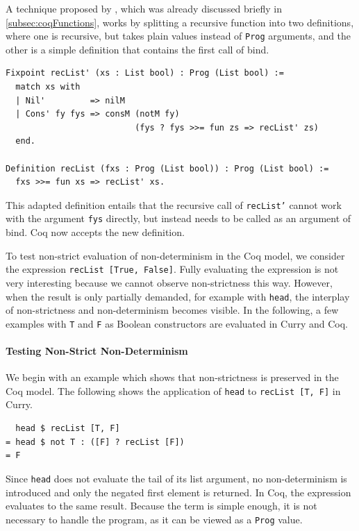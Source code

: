 \documentclass[a4paper, 11pt, fleqn, twoside, abstract=on]{scrreprt}
\newcommand{\hinl}[1]{\texttt{#1}}
\newcommand{\cinl}[1]{\texttt{#1}}
\begin{document}
A technique proposed by \citet{chlipala2013certified}, which was already discussed briefly in \autoref{subsec:coqFunctions}, works by splitting a recursive function into two definitions, where one is recursive, but takes plain values instead of \cinl{Prog} arguments, and the other is a simple definition that contains the first call of bind.
\pagebreak
\begin{verbatim}
Fixpoint recList' (xs : List bool) : Prog (List bool) :=
  match xs with
  | Nil'         => nilM
  | Cons' fy fys => consM (notM fy)
                          (fys ? fys >>= fun zs => recList' zs)
  end.

Definition recList (fxs : Prog (List bool)) : Prog (List bool) :=
  fxs >>= fun xs => recList' xs.
\end{verbatim}

This adapted definition entails that the recursive call of \hinl{recList'} cannot work with the argument \cinl{fys} directly, but instead needs to be called as an argument of bind.
Coq  now accepts the new definition.

To test non-strict evaluation of non-determinism in the Coq model, we consider the expression \hinl{recList [True, False]}.
Fully evaluating the expression is not very interesting because we cannot observe non-strictness this way.
However, when the result is only partially demanded, for example with \cinl{head}, the interplay of non-strictness and non-determinism becomes visible.
In the following, a few examples with \hinl{T} and \hinl{F} as Boolean constructors are evaluated in Curry and Coq.

\paragraph{Testing Non-Strict Non-Determinism}
We begin with an example which shows that non-strictness is preserved in the Coq model.
The following shows the application of \cinl{head} to \cinl{recList [T, F]} in Curry.

\begin{verbatim}
  head $ recList [T, F]
= head $ not T : ([F] ? recList [F])
= F
\end{verbatim}
\noindent
Since \hinl{head} does not evaluate the tail of its list argument, no non-determinism is introduced and only the negated first element is returned.
In Coq, the expression evaluates to the same result.
Because the term is simple enough, it is not necessary to handle the program, as it can be viewed as a \cinl{Prog} value.
\end{document}
